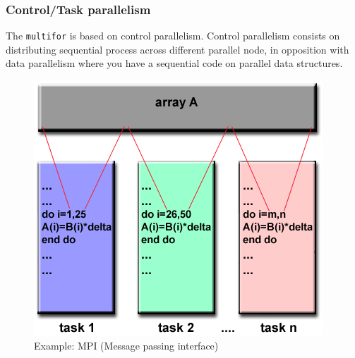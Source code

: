 \documentclass{beamer}
\begin{document}
\begin{frame}
\frametitle{Control/Task parallelism}

The \texttt{multifor} is based on control parallelism. \newline
Control parallelism consists on distributing sequential process across different parallel node, in opposition with data parallelism where you have a sequential code on parallel data structures.

\begin{figure}[h]

\centering
\begin{minipage}[t]{0.30\textwidth}

\centering
\includegraphics[width=\textwidth]{pictures/data-parallelism}
 \\
Example: MPI (Message passing interface)
\end{minipage}~%
\begin{minipage}[t]{0.30\textwidth}


\end{minipage}
\end{figure}
\end{frame}
\end{document}
